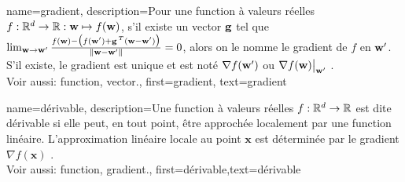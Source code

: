 {name={gradient},
	description={Pour une \gls{function} à valeurs réelles 
		$f: \mathbb{R}^{d} \rightarrow \mathbb{R}: {\bf w} \mapsto f({\bf w})$,  
		s’il existe un \gls{vector} ${\bf g}$ tel que  
		$\lim_{{\bf w} \rightarrow {\bf w}'} \frac{f({\bf w}) - \big(f({\bf w}')+ {\bf g}\,^{T} ({\bf w}- {\bf w}') \big) }{\| {\bf w}-{\bf w}'\|}=0$,  
		alors on le nomme le gradient de $f$ en ${\bf w}'$. S’il existe, le gradient est unique et  
		est noté $\nabla f({\bf w}')$ ou $\nabla f({\bf w})\big|_{{\bf w}'}$ \cite{RudinBookPrinciplesMatheAnalysis}.
		\\ 
		Voir aussi: \gls{function}, \gls{vector}.},
	first={gradient}, text={gradient}
}

{name={dérivable},
	description={Une \gls{function} à valeurs réelles $f: \mathbb{R}^{d} \rightarrow \mathbb{R}$ 
		est dite dérivable si elle peut, en tout point, être approchée localement par une \gls{function} 
		linéaire. L’approximation linéaire locale au point $\mathbf{x}$ est déterminée 
		par le \gls{gradient} $\nabla f ( \mathbf{x})$ \cite{RudinBookPrinciplesMatheAnalysis}.
		\\ 
		Voir aussi: \gls{function}, \gls{gradient}.},
	first={dérivable},text={dérivable} 
}

